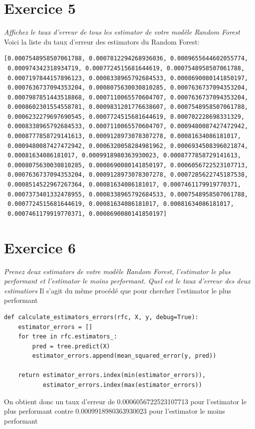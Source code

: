 \documentclass[a4paper, 12pt, oneside]{book}
\begin{document}
\section{Exercice 5}
\textit{Affichez le taux d’erreur de tous les estimator de votre modèle Random Forest}
\newline \newline
Voici la liste du taux d'erreur des estimators du Random Forest:
\begin{verbatim}
[0.0007548958507061788, 0.0007812294268936036, 0.0009655644602055774, 
 0.000974342318934719, 0.0007724515681644619, 0.0007548958507061788, 
 0.0007197844157896123, 0.0008338965792684533, 0.0008690080141850197, 
 0.0007636737094353204, 0.0008075630030810285, 0.0007636737094353204,
 0.0007987851443518868, 0.0007110065570604707, 0.0007636737094353204, 
 0.0008602301554558781, 0.0009831201776638607, 0.0007548958507061788, 
 0.0006232279697690545, 0.0007724515681644619, 0.000702228698331329, 
 0.0008338965792684533, 0.0007110065570604707, 0.0009480087427472942, 
 0.0008777858729141613, 0.0009128973078307278, 0.00081634086181017, 
 0.0009480087427472942, 0.0006320058284981962, 0.0006934508396021874, 
 0.00081634086181017, 0.0009918980363930023, 0.0008777858729141613, 
 0.0008075630030810285, 0.0008690080141850197, 0.0006056722523107713,
 0.0007636737094353204, 0.0009128973078307278, 0.0007285622745187538, 
 0.0008514522967267364, 0.00081634086181017, 0.0007461179919770371, 
 0.0007373401332478955, 0.0008338965792684533, 0.0007548958507061788, 
 0.0007724515681644619, 0.00081634086181017, 0.00081634086181017, 
 0.0007461179919770371, 0.0008690080141850197]
\end{verbatim}



\section{Exercice 6}
\textit{Prenez deux estimators de votre modèle Random Forest, l'estimator le plus performant et l'estimator le moins performant. Quel est le taux d'erreur des deux estimatiors}
\newline \newline
Il s'agit du même procédé que pour chercher l'estimator le plus performant
\begin{verbatim}
def calculate_estimators_errors(rfc, X, y, debug=True):
    estimator_errors = []
    for tree in rfc.estimators_:
        pred = tree.predict(X)
        estimator_errors.append(mean_squared_error(y, pred))

    return estimator_errors.index(min(estimator_errors)),
           estimator_errors.index(max(estimator_errors))
\end{verbatim}
On obtient donc un taux d'erreur de 0.0006056722523107713 pour l'estimator le plus performant contre 0.0009918980363930023 pour l'estimator le moins performant
\end{document}
